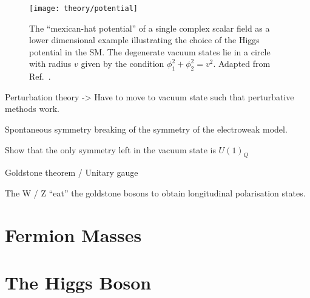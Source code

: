 \begin{figure}[htbp]
  \centering

  \texttt{[image: theory/potential]}

  \caption{The ``mexican-hat potential'' of a single complex scalar field as a
    lower dimensional example illustrating the choice of the Higgs potential in
    the SM. The degenerate vacuum states lie in a circle with radius $v$ given
    by the condition $\phi_1^2 + \phi_2^2 = v^2$. Adapted from
    Ref.~\cite{higgs_potential_tikz}.}%
  \label{fig:mexican_hat}
\end{figure}

Perturbation theory -> Have to move to vacuum state such that perturbative
methods work.

Spontaneous symmetry breaking of the symmetry of the electroweak model.

Show that the only symmetry left in the vacuum state is $U(1)_Q$

Goldstone theorem / Unitary gauge

The W / Z ``eat'' the goldstone bosons to obtain longitudinal polarisation
states.





\section{Fermion Masses}

\section{The Higgs Boson}


\clearpage

